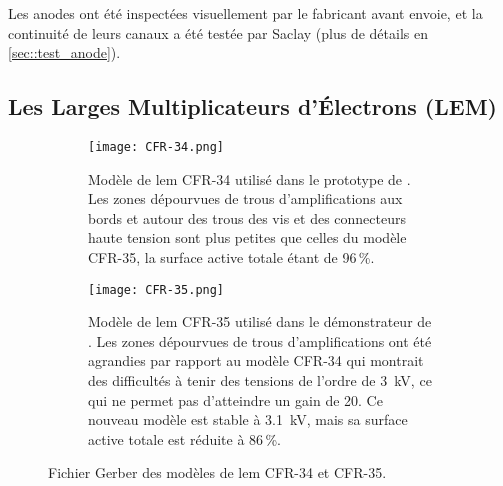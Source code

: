       Les anodes ont été inspectées visuellement par le fabricant avant envoie, et la continuité de leurs canaux a été testée par Saclay (plus de détails en \autoref{sec::test_anode}).
        
    \subsection{Les Larges Multiplicateurs d'Électrons (LEM)}\label{sec::LEM}

      \begin{figure}[htbp]
        \begin{subfigure}[t]{0.48\textwidth}
          \centering
          \captionsetup{width=.95\linewidth}
          \texttt{[image: CFR-34.png]}
          \caption{\label{fig::cfr34}Modèle de \gls{lem} CFR-34 utilisé dans le prototype de \TOO{}. Les zones dépourvues de trous d'amplifications aux bords et autour des trous des vis et des connecteurs haute tension sont plus petites que celles du modèle CFR-35, la surface active totale étant de 96\,\%.}
        \end{subfigure}
        \hfill
        \begin{subfigure}[t]{0.48\textwidth}
          \centering
          \captionsetup{width=.95\linewidth}
          \texttt{[image: CFR-35.png]}
          \caption{\label{fig::cfr35}Modèle de \gls{lem} CFR-35 utilisé dans le démonstrateur de \SSS{}. Les zones dépourvues de trous d'amplifications ont été agrandies par rapport au modèle CFR-34 qui montrait des difficultés à tenir des tensions de l'ordre de \SI{3}{\kilo\volt}, ce qui ne permet pas d'atteindre un gain de 20. Ce nouveau modèle est stable à \SI{3.1}{\kilo\volt}, mais sa surface active totale est réduite à 86\,\%.}
        \end{subfigure}
        \caption[Modèle de \gls{lem} CFR-34 et CFR-35.]{Fichier Gerber des modèles de \gls{lem} CFR-34 et CFR-35.}
        \label{fig::cfrs}
      \end{figure}

            
